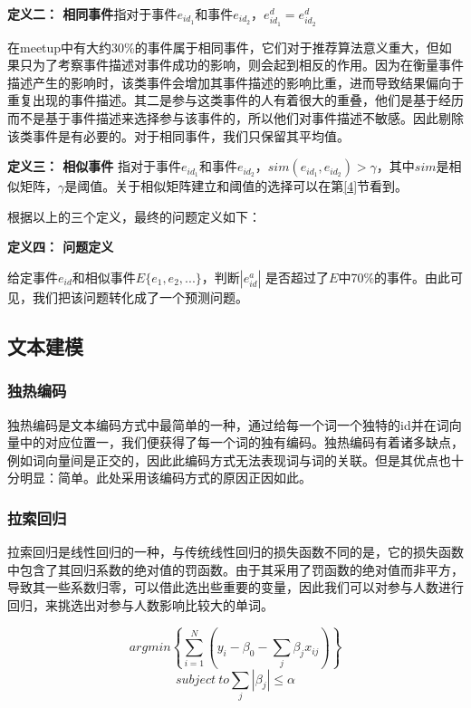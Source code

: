 \textbf{定义二： 相同事件}指对于事件\(e_{id_1}\)和事件\(e_{id_2}\)，\(e_{id_1}^d=e_{id_2}^d\)

在meetup中有大约30\%的事件属于相同事件，它们对于推荐算法意义重大，但如果只为了考察事件描述对事件成功的影响，则会起到相反的作用。因为在衡量事件描述产生的影响时，该类事件会增加其事件描述的影响比重，进而导致结果偏向于重复出现的事件描述。其二是参与这类事件的人有着很大的重叠，他们是基于经历而不是基于事件描述来选择参与该事件的，所以他们对事件描述不敏感。因此剔除该类事件是有必要的。对于相同事件，我们只保留其平均值。

\textbf{定义三： 相似事件}
指对于事件\(e_{id_1}\)和事件\(e_{id_2}\)，\(sim(e_{id_1},e_{id_2})>\gamma\)，其中\(sim\)是相似矩阵，\(\gamma\)是阈值。关于相似矩阵建立和阈值的选择可以在第\ref{4}节看到。

根据以上的三个定义，最终的问题定义如下：

\textbf{定义四： 问题定义}

给定事件\(e_{id}\)和相似事件\(E\{e_1,e_2,...\}\)，判断\(|e_{id}^a|\)
是否超过了\(E\)中70\%的事件。由此可见，我们把该问题转化成了一个预测问题。

\subsection{文本建模}

\subsubsection{独热编码}

独热编码是文本编码方式中最简单的一种，通过给每一个词一个独特的id并在词向量中的对应位置一，我们便获得了每一个词的独有编码。独热编码有着诸多缺点，例如词向量间是正交的，因此此编码方式无法表现词与词的关联。但是其优点也十分明显：简单。此处采用该编码方式的原因正因如此。

\subsubsection{拉索回归}

拉索回归是线性回归的一种，与传统线性回归的损失函数不同的是，它的损失函数中包含了其回归系数的绝对值的罚函数。由于其采用了罚函数的绝对值而非平方，导致其一些系数归零，可以借此选出些重要的变量\cite{tibshirani_regression_1996}，因此我们可以对参与人数进行回归，来挑选出对参与人数影响比较大的单词\cite{noauthor_predicting_nodate}。

\[
argmin\left\{\displaystyle\sum_{i=1}^N\left(y_i-\beta_0-\displaystyle\sum_j\beta_jx_{ij}\right)\right\}
\] \[subject\ to \displaystyle\sum_j|\beta_j|\leq\alpha\]\\

